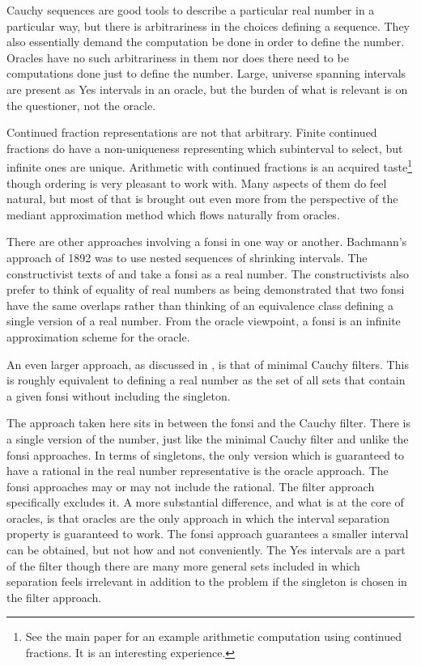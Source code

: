 \documentclass[12pt]{article}
\begin{document}
Cauchy sequences are good tools to describe a particular real number in a particular way, but there is arbitrariness in the choices defining a sequence. They also essentially demand the computation be done in order to define the number. Oracles have no such arbitrariness in them nor does there need to be computations done just to define the number. Large, universe spanning intervals are present as Yes intervals in an oracle, but the burden of what is relevant is on the questioner, not the oracle. 

Continued fraction representations are not that arbitrary. Finite continued fractions do have a non-uniqueness representing which subinterval to select, but infinite ones are unique. Arithmetic with continued fractions is an acquired taste\footnote{See the main paper for an example arithmetic computation using continued fractions. It is an interesting experience.} though ordering is very pleasant to work with. Many aspects of them do feel natural, but most of that is brought out even more from the perspective of the mediant approximation method which flows naturally from oracles. 

There are other approaches involving a fonsi in one way or another. Bachmann's approach of 1892 was to use nested sequences of shrinking intervals. The constructivist texts of \cite{bridger} and \cite{bridges} take a fonsi as a real number. The constructivists also prefer to think of equality of real numbers as being demonstrated that two fonsi have the same overlaps rather than thinking of an equivalence class defining a single version of a real number.  From the oracle viewpoint, a fonsi is an infinite approximation scheme for the oracle. 


An even larger approach, as discussed in \cite{ittay-2015}, is that of minimal Cauchy filters. This is roughly equivalent to defining a real number as the set of all sets that contain a given fonsi without including the singleton. 

The approach taken here sits in between the fonsi and the Cauchy filter. There is a single version of the number, just like the minimal Cauchy filter and unlike the fonsi approaches. In terms of singletons, the only version which is guaranteed to have a rational in the real number representative is the oracle approach. The fonsi approaches may or may not include the rational. The filter approach specifically excludes it. A more substantial difference, and what is at the core of oracles, is that oracles are the only approach in which the interval separation property is guaranteed to work. The fonsi approach guarantees a smaller interval can be obtained, but not how and not conveniently. The Yes intervals are a part of the filter though there are many more general sets included in which separation feels irrelevant in addition to the problem if the singleton is chosen in the filter approach. 
\end{document}
